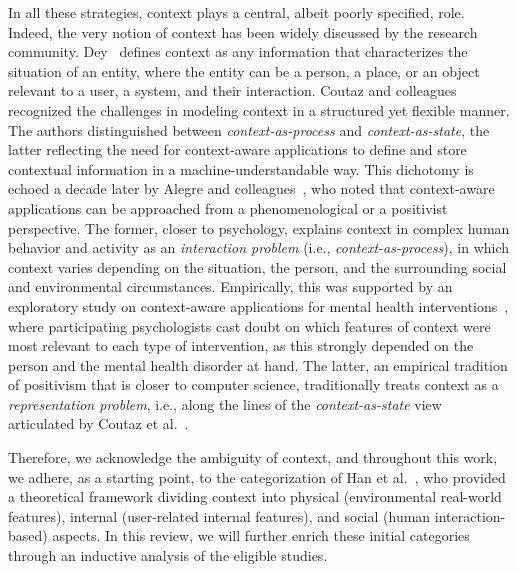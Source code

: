 In all these strategies, context plays a central, albeit poorly specified, role. Indeed, the very notion of context has been widely discussed by the research community. Dey~\cite{dey2001understanding} defines context as any information that characterizes the situation of an entity, where the entity can be a person, a place, or an object relevant to a user, a system, and their interaction. Coutaz and colleagues~\cite{coutaz2005} recognized the challenges in modeling context in a structured yet flexible manner. The authors distinguished between \textit{context-as-process} and \textit{context-as-state}, the latter reflecting the need for context-aware applications to define and store contextual information in a machine-understandable way. This dichotomy is echoed a decade later by Alegre and colleagues~\cite{alegre2016}, who noted that context-aware applications can be approached from a phenomenological or a positivist perspective. The former, closer to psychology, explains context in complex human behavior and activity as an \textit{interaction problem} (i.e., \textit{context-as-process}), in which context varies depending on the situation, the person, and the surrounding social and environmental circumstances. Empirically, this was supported by an exploratory study on context-aware applications for mental health interventions~\cite{miralles2019}, where participating psychologists cast doubt on which features of context were most relevant to each type of intervention, as this strongly depended on the person and the mental health disorder at hand. The latter, an empirical tradition of positivism that is closer to computer science, traditionally treats context as a \textit{representation problem}, i.e., along the lines of the \textit{context-as-state} view articulated by Coutaz et al.~\cite{coutaz2005}. 

Therefore, we acknowledge the ambiguity of context, and throughout this work, we adhere, as a starting point, to the categorization of Han et al.~\cite{han2008contextaware}, who provided a theoretical framework dividing context into physical (environmental real-world features), internal (user-related internal features), and social (human interaction-based) aspects. In this review, we will further enrich these initial categories through an inductive analysis of the eligible studies. 

